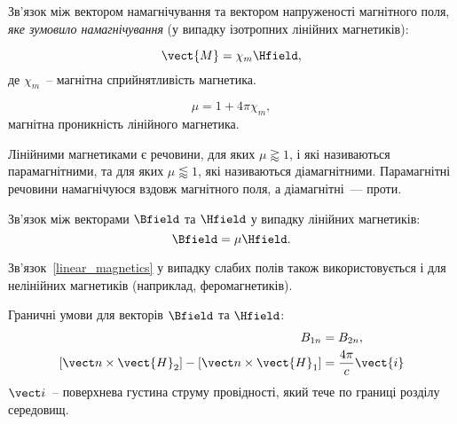 \begin{Theory}
  Зв'язок між вектором намагнічування та вектором напруженості магнітного поля, \emph{яке зумовило намагнічування} (у випадку ізотропних лінійних магнетиків):

  \begin{equation}
	  \vect{M} = \chi_m\Hfield,
  \end{equation}
  де $\chi_m$~-- магнітна сприйнятливість магнетика.

  \begin{equation}
	  \mu = 1 + 4\pi\chi_m,
  \end{equation}
  магнітна проникність лінійного магнетика.

  Лінійними магнетиками є речовини, для яких $\mu \gtrapprox 1$, і які називаються  парамагнітними, та для яких $\mu \lessapprox 1$, які називаються діамагнітними. Парамагнітні речовини намагнічуюся вздовж магнітного поля, а діамагнітні~--- проти.

	Зв'язок між векторами  $\Bfield$ та $\Hfield$ у випадку лінійних магнетиків:
	\begin{equation}\label{linear_magnetics}
		\Bfield = \mu \Hfield.
	\end{equation}

	Зв'язок~\ref{linear_magnetics} у випадку слабих полів також використовується і для нелінійних магнетиків (наприклад, феромагнетиків).


  Граничні умови для векторів $\Bfield$ та $\Hfield$:
  \begin{align}
	  B_{1n}                & = B_{2n},         \label{B_boundary}\\
	  \left[ \vect n \times \vect{H}_{2}\right]  - \left[ \vect n \times \vect{H}_{1}\right]  & = \frac{4\pi}{c}\vect{i} \label{H_boundary}
  \end{align}
  $\vect i$~-- поверхнева густина струму провідності, який тече по границі розділу середовищ.
\end{Theory}


%

